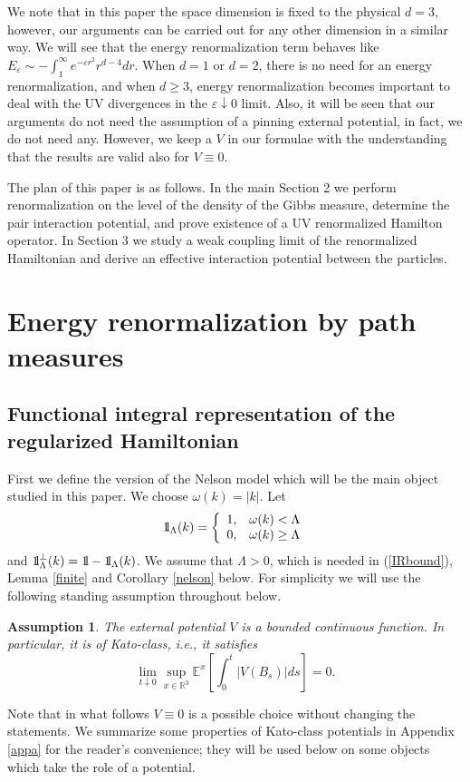 \documentclass[11pt]{article}
\newtheorem{assumption}[theorem]{Assumption}
\def\bbbone{{\mathchoice {\rm 1\mskip-4mu l} {\rm 1\mskip-4mu l}
{\rm 1\mskip-4.5mu l} {\rm 1\mskip-5mu l}}}
\def\one{\bbbone}
\newcommand{\kp}{\one_\Lambda^\perp(k)}
\newcommand{\Ebb}{{\mathbb E}}
\providecommand{\eq}[1]{\begin{equation}\label{#1}}
\providecommand{\en}{\end{equation}}
\providecommand{\RR}{\mathbb{R}}
\providecommand{\kak}[1]{(\ref{#1})}
\providecommand{\lkk}{\left\{}
\providecommand{\la}{{\Lambda}}
\providecommand{\1}{\mathbb{1}}
\providecommand{\eps}{\varepsilon}
\begin{document}
\bigskip
We note that in this paper the space dimension is fixed to the physical $d=3$, however, our arguments can
be carried out for any other dimension in a similar way. We will see that the energy renormalization term
behaves like $E_\eps\sim -\int_1^\infty e^{-\eps r^2} r^{d-4} dr$. When $d=1$ or $d=2$, there is no need
for an energy renormalization, and when $d\geq 3$, energy renormalization becomes important to deal with
the UV divergences in the $\eps\downarrow 0$ limit. Also, it will be seen that our arguments do not need 
the assumption of a pinning external potential, in fact, we do not need any. However, we keep a $V$ in our 
formulae with the understanding that the results are valid also for $V \equiv 0$. 


\bigskip
\noindent
The plan of this paper is as follows. In the main Section 2 we perform renormalization on the level of the
density of the Gibbs measure, determine the pair interaction potential, and prove existence of a UV
renormalized Hamilton operator. In Section 3 we study a weak coupling limit of the renormalized Hamiltonian
and derive an effective interaction potential between the particles.


\section{Energy renormalization by path measures}
\subsection{Functional integral representation of the regularized Hamiltonian}
First we define the version of the Nelson model which will be the main object studied in this paper. We choose
$\omega(k)=|k|$. Let
$$
\one_\la(k) =
\lkk
\begin{array}{ll}
1,& \omega(k) < \la \\
0,& \omega(k)\geq\la
\end{array}
\right.
$$
and $\kp=\one-\one_\la(k)$. We assume that  $\Lambda> 0$, which is needed in \kak{IRbound},  Lemma
\ref{finite} and Corollary \ref{nelson} below. For simplicity we will use the following standing assumption
throughout below.
\begin{assumption}
The external potential $V$ is a bounded continuous function. In particular, it is of Kato-class, i.e.,
it satisfies
\eq{kato11}
\lim_{t\downarrow 0}\sup_{x\in\RR^3} \Ebb^x\!\left [\int_0^t |V(B_s)|ds\right ]=0.
\en
\end{assumption}
Note that in what follows $V\equiv 0$ is a possible choice without changing the statements. We summarize 
some properties of Kato-class potentials in Appendix \ref{appa} for the reader's convenience; they will be 
used below on some objects which take the role of a potential. 
\end{document}
